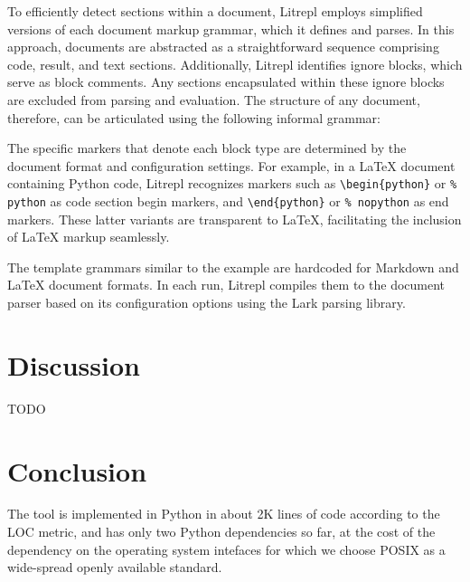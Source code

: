 \documentclass[a4paper,12pt,twocolumn]{article}
\begin{document}
To efficiently detect sections within a document, Litrepl employs simplified
versions of each document markup grammar, which it defines and parses. In this
approach, documents are abstracted as a straightforward sequence comprising
code, result, and text sections. Additionally, Litrepl identifies ignore blocks,
which serve as block comments. Any sections encapsulated within these ignore
blocks are excluded from parsing and evaluation. The structure of any document,
therefore, can be articulated using the following informal grammar:

The specific markers that denote each block type are determined by the document
format and configuration settings. For example, in a LaTeX document containing
Python code, Litrepl recognizes markers such as \verb|\begin|\verb|{python}| or
\verb|% |\verb|python| as code section begin markers, and
\verb|\end|\verb|{python}| or \verb|% |\verb|nopython| as end markers. These
latter variants are transparent to LaTeX, facilitating the inclusion of LaTeX
markup seamlessly.

The template grammars similar to the example are hardcoded for Markdown and
LaTeX document formats. In each run, Litrepl compiles them to the document
parser based on its configuration options using the Lark\cite{Lark} parsing
library.

\section{Discussion}

TODO

\section{Conclusion}

The tool is implemented in Python in about 2K lines of code according to the LOC
metric, and has only two Python dependencies so far, at the cost of the
dependency on the operating system intefaces for which we choose POSIX as a
wide-spread openly available standard.

\printbibliography
\end{document}
